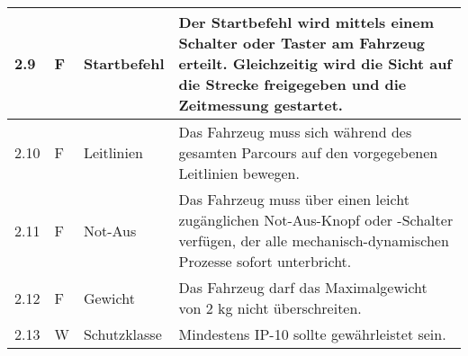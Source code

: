 \documentclass[main.tex]{subfiles} %
\begin{document}
\begin{tabular}{|l|p{0.5cm}|p{4cm}|p{10cm}|}
  \hline
  2.9          & F          & Startbefehl           & Der Startbefehl wird mittels einem Schalter oder Taster am Fahrzeug erteilt. Gleichzeitig wird die Sicht auf die Strecke freigegeben und die Zeitmessung gestartet.                                                                                                                                                                        \\
  \hline
  2.10         & F          & Leitlinien            & Das Fahrzeug muss sich während des gesamten Parcours auf den vorgegebenen Leitlinien bewegen.                                                                                                                                                                                                                                              \\
  \hline
  2.11         & F          & Not-Aus               & Das Fahrzeug muss über einen leicht zugänglichen Not-Aus-Knopf oder -Schalter verfügen, der alle mechanisch-dynamischen Prozesse sofort unterbricht.                                                                                                                                                                                       \\
  \hline
  2.12         & F          & Gewicht               & Das Fahrzeug darf das Maximalgewicht von 2 kg nicht überschreiten.                                                                                                                                                                                                                                                                         \\
  \hline
  2.13         & W          & Schutzklasse          & Mindestens IP-10 sollte gewährleistet sein.                                                                                                                                                                                                                                                                                                \\
  \hline
\end{tabular}
\end{document}
